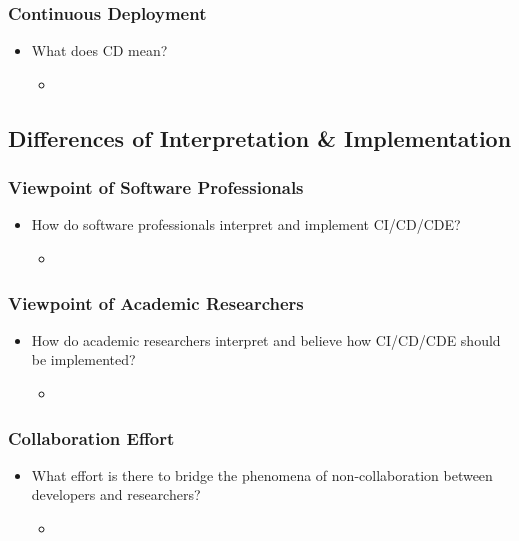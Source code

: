 \documentclass[11pt,a4paper]{article}
\begin{document}
		\subsubsection{Continuous Deployment}
		\begin{itemize}[noitemsep]
			\item What does CD mean?
			\begin{itemize}
				\item
			\end{itemize}
		\end{itemize}
		
	\subsection{Differences of Interpretation \& Implementation}
		\subsubsection{Viewpoint of Software Professionals}
		\begin{itemize}[noitemsep]
			\item How do software professionals interpret and implement CI/CD/CDE?
			\begin{itemize}
				\item
			\end{itemize}
		\end{itemize}
		\subsubsection{Viewpoint of Academic Researchers}
		\begin{itemize}[noitemsep]
			\item How do academic researchers interpret and believe how CI/CD/CDE should be implemented?
			\begin{itemize}
				\item
			\end{itemize}
		\end{itemize}
		\subsubsection{Collaboration Effort}
		\begin{itemize}[noitemsep]
			\item What effort is there to bridge the phenomena of non-collaboration between developers and researchers?
			\begin{itemize}
				\item
			\end{itemize}
		\end{itemize}
\end{document}
